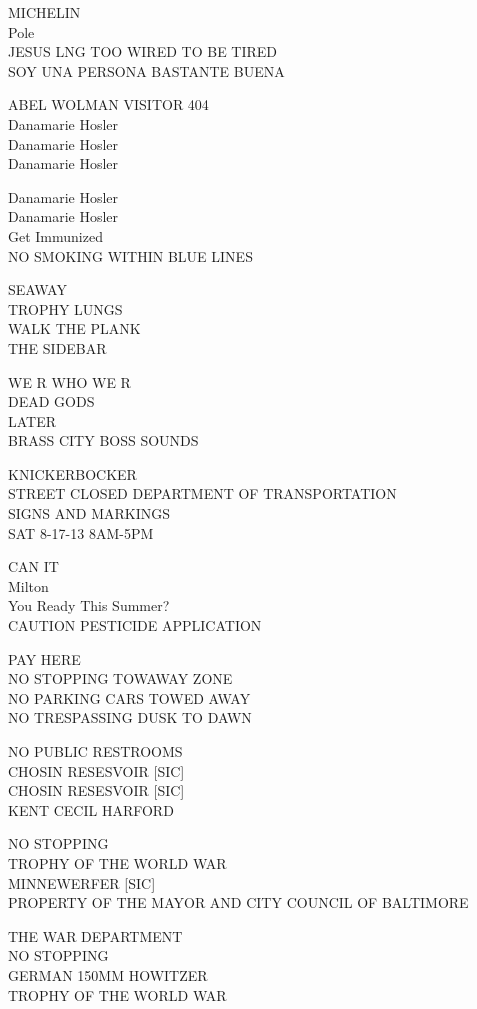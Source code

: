 \documentclass[10pt,letterpaper]{article}
\begin{document}
MICHELIN\\
Pole\\
JESUS LNG TOO WIRED TO BE TIRED\\
SOY UNA PERSONA BASTANTE BUENA

ABEL WOLMAN VISITOR 404\\
Danamarie Hosler\\
Danamarie Hosler\\
Danamarie Hosler

Danamarie Hosler\\
Danamarie Hosler\\
Get Immunized\\
NO SMOKING WITHIN BLUE LINES

SEAWAY\\
TROPHY LUNGS\\
WALK THE PLANK\\
THE SIDEBAR

WE R WHO WE R\\
DEAD GODS\\
LATER\\
BRASS CITY BOSS SOUNDS

KNICKERBOCKER\\
STREET CLOSED DEPARTMENT OF TRANSPORTATION\\
SIGNS AND MARKINGS\\
SAT 8{-}17{-}13 8AM{-}5PM

CAN IT\\
Milton\\
You Ready This Summer?\\
CAUTION PESTICIDE APPLICATION

PAY HERE\\
NO STOPPING TOWAWAY ZONE\\
NO PARKING CARS TOWED AWAY\\
NO TRESPASSING DUSK TO DAWN

NO PUBLIC RESTROOMS\\
CHOSIN RESESVOIR {[}SIC{]}\\
CHOSIN RESESVOIR {[}SIC{]}\\
KENT CECIL HARFORD

NO STOPPING\\
TROPHY OF THE WORLD WAR\\
MINNEWERFER {[}SIC{]}\\
PROPERTY OF THE MAYOR AND CITY COUNCIL OF BALTIMORE

THE WAR DEPARTMENT\\
NO STOPPING\\
GERMAN 150MM HOWITZER\\
TROPHY OF THE WORLD WAR
\end{document}
